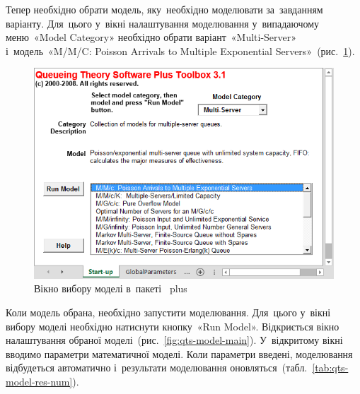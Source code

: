 \documentclass[
  ukrainian,
  simple,
  floatsection,
]{eskdnaukvd}
\begin{document}
      Тепер необхідно обрати модель, яку~необхідно моделювати за~завданням варіанту. Для~цього у~вікні налаштування моделювання у~випадаючому меню~«\textenglish{Model Category}» необхідно обрати варіант~«\textenglish{Multi-Server}» і~модель~«\textenglish{M/M/C: Poisson Arrivals to Multiple Exponential Servers}»~(рис.~\ref{fig:qts-model-sel}).

      \begin{figure}[!htbp]
        \centering
        \includegraphics[height = 9 \baselineskip]{./assets/02-qts-model-sel.png}
        \caption{Вікно вибору моделі в~пакеті~\textenglish{ plus }}
        \label{fig:qts-model-sel}
      \end{figure}

      Коли модель обрана, необхідно запустити моделювання. Для~цього у~вікні вибору моделі необхідно натиснути кнопку~«\textenglish{Run Model}». Відкриється вікно налаштування обраної моделі~(рис.~\ref{fig:qts-model-main}). У~відкритому вікні вводимо параметри математичної моделі. Коли параметри введені, моделювання відбудеться автоматично і~результати моделювання оновляться~(табл.~\ref{tab:qts-model-res-num}).
\end{document}
